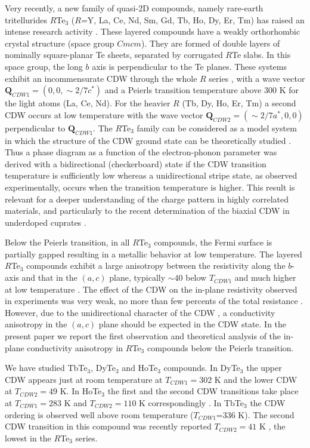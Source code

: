 Very recently, a new family of quasi-2D compounds, namely rare-earth
tritellurides $R$Te$_{3}$ ($R$=Y, La, Ce, Nd, Sm, Gd, Tb, Ho, Dy,
Er, Tm) has raised an intense research activity
\cite{DiMasi95,Brouet08,Ru08}. These layered compounds have a weakly
orthorhombic crystal structure (space group $Cmcm$). They are formed
of double layers of nominally square-planar Te sheets, separated by
corrugated $R$Te slabs. In this space group, the long $b$ axis is
perpendicular to the Te planes. These systems exhibit an
incommensurate CDW through the whole $R$ series
\cite{Ru08,Lavagnini10R}, with a wave vector
$\mathbf{Q}_{CDW1}=(0,0,\sim 2/7c^{\ast})$ and a Peierls transition
temperature above 300 K for the light atoms (La, Ce, Nd). For the
heavier $R$ (Tb, Dy, Ho, Er, Tm) a second CDW occurs at low
temperature with the wave vector $\mathbf{Q}_{CDW2}=(\sim
2/7a^{\ast},0,0)$ perpendicular to $\mathbf{Q}_{CDW1}$. The
$R$Te$_3$ family can be considered as a model system in which the
structure of the CDW ground state can be theoretically studied
\cite{Yao06}. Thus a phase diagram as a function of the
electron-phonon parameter was derived with a bidirectional
(checkerboard) state if the CDW transition temperature is
sufficiently low whereas a unidirectional stripe state, as observed
experimentally, occurs when the transition temperature is higher.
This result is relevant for a deeper understanding of the charge
pattern in highly correlated materials, and particularly to the
recent determination of the biaxial CDW in underdoped cuprates
\cite{LeBoeuf2013}.

Below the Peierls transition, in all $R$Te$_3$ compounds, the Fermi
surface is partially gapped resulting in a metallic behavior at low
temperature. The layered $R$Te$_3$ compounds exhibit a large
anisotropy between the resistivity along the $b$-axis and that in
the $(a,c)$ plane, typically $\sim40$ below $T_{CDW1}$ and much
higher at low temperature \cite{Ru06}. The effect of the CDW on the
in-plane resistivity observed in experiments was very weak, no more
than few percents of the total resistance \cite{Ru08,Ru06}. However,
due to the unidirectional character of the CDW
\cite{Fang07,Lavagnini10R,Yao06}, a conductivity anisotropy in the
$(a,c)$ plane should be expected in the CDW state. In the present
paper we report the first observation and theoretical analysis of
the in-plane conductivity anisotropy in $R$Te$_{3}$ compounds below
the Peierls transition.

We have studied TbTe$_3$, DyTe$_3$ and HoTe$_3$ compounds. In
DyTe$_3$ the upper CDW appears just at room temperature at
$T_{CDW1}=302 $ K and the lower CDW at $T_{CDW2}=49$ K. In HoTe$_3$
the first and the second CDW transitions take place at
$T_{CDW1}=283$ K and $T_{CDW2}=110$ K correspondingly \cite{Ru08}.
In TbTe$_3$ the CDW ordering is observed well above room temperature
($T_{CDW1}$=336 K). The second CDW transition in this compound was
recently reported $T_{CDW2}=41$ K \cite{BB}, the lowest in the
$R$Te$_3$ series.

